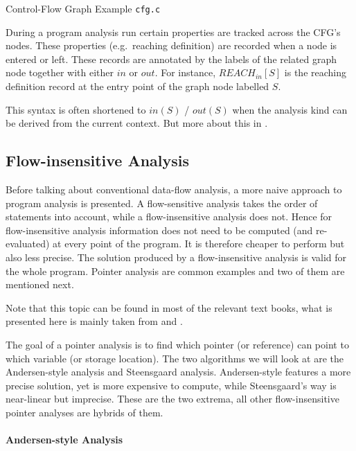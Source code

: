 \documentclass[article]{uibk}
\newenvironment{codebox}{\captionsetup{type=listing}}{}
\begin{document}
\begin{codebox}
    \vspace{-1.5em}
    \caption{Control-Flow Graph Example \texttt{cfg.c}}
    \label{src:cfg}
\end{codebox}

During a program analysis run certain properties are tracked across the CFG's
nodes. These properties (e.g.\ reaching definition) are recorded when a node is
entered or left. These records are annotated by the labels of the related graph
node together with either $in$ or $out$. For instance, $REACH_{in}[S]$ is the
reaching definition record at the entry point of the graph node labelled
$S$.~\cite{wiki:reaching_definition}

This syntax is often shortened to $in(S)$ / $out(S)$ when the analysis kind can
be derived from the current context. But more about this in
.

\subsection{Flow-insensitive Analysis}

Before talking about conventional data-flow analysis, a more naive approach to
program analysis is presented. A flow-sensitive analysis takes the order of
statements into account, while a flow-insensitive analysis does not. Hence for
flow-insensitive analysis information does not need to be computed (and
re-evaluated) at every point of the program. It is therefore cheaper to perform
but also less precise. The solution produced by a flow-insensitive analysis is
valid for the whole program. Pointer analysis are common examples and two of
them are mentioned next.

Note that this topic can be found in most of the relevant text books, what is
presented here is mainly taken from \cite{slides:flow-insensitive} and
\cite{wiki:pointer-analysis}.

The goal of a pointer analysis is to find which pointer (or reference) can
point to which variable (or storage location). The two algorithms we will look
at are the Andersen-style analysis and Steensgaard analysis. Andersen-style
features a more precise solution, yet is more expensive to compute, while
Steensgaard's way is near-linear but imprecise. These are the two extrema, all
other flow-insensitive pointer analyses are hybrids of them.

\paragraph{Andersen-style Analysis}
\end{document}
